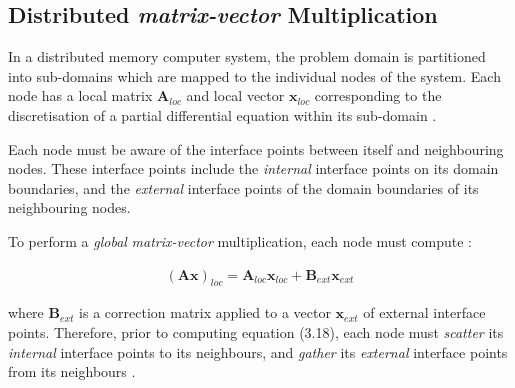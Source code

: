 %
%
\subsection{Distributed \emph{matrix-vector} Multiplication}

In a distributed memory computer system, the problem domain is partitioned into sub-domains which are mapped to the individual nodes of the system. Each node has a local matrix $\mathbf{A}_{loc}$ and local vector $\mathbf{x}_{loc}$ corresponding to the discretisation of a partial differential equation within its sub-domain \cite{saad}.

Each node must be aware of the interface points between itself and neighbouring nodes. These interface points include the \emph{internal} interface points on its domain boundaries, and the \emph{external} interface points of the domain boundaries of its neighbouring nodes.

To perform a \emph{global} \emph{matrix-vector} multiplication, each node must compute \cite{saad}:

\begin{align}
(\mathbf{Ax})_{loc} = \mathbf{A}_{loc} \mathbf{x}_{loc} + \mathbf{B}_{ext} \mathbf{x}_{ext}
\end{align}

where $\mathbf{B}_{ext}$ is a correction matrix applied to a vector $\mathbf{x}_{ext}$ of external interface points. Therefore, prior to computing equation (3.18), each node must \emph{scatter} its \emph{internal} interface points to its neighbours, and \emph{gather} its \emph{external} interface points from its neighbours \cite{saad}.




